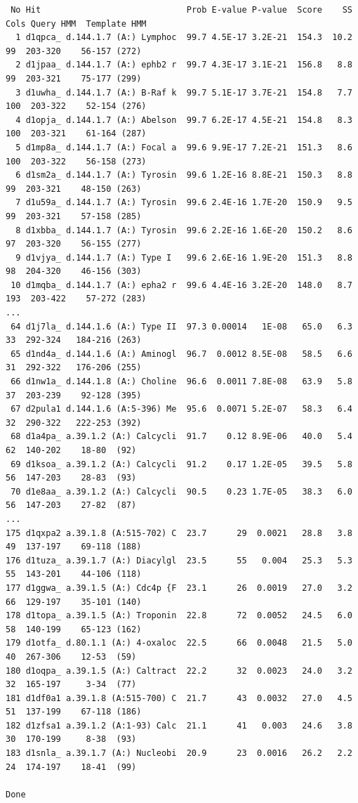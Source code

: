 \documentclass[11pt,a4paper]{article}
\begin{document}
\begin{verbatim}
 No Hit                             Prob E-value P-value  Score    SS Cols Query HMM  Template HMM
  1 d1qpca_ d.144.1.7 (A:) Lymphoc  99.7 4.5E-17 3.2E-21  154.3  10.2   99  203-320    56-157 (272)
  2 d1jpaa_ d.144.1.7 (A:) ephb2 r  99.7 4.3E-17 3.1E-21  156.8   8.8   99  203-321    75-177 (299)
  3 d1uwha_ d.144.1.7 (A:) B-Raf k  99.7 5.1E-17 3.7E-21  154.8   7.7  100  203-322    52-154 (276)
  4 d1opja_ d.144.1.7 (A:) Abelson  99.7 6.2E-17 4.5E-21  154.8   8.3  100  203-321    61-164 (287)
  5 d1mp8a_ d.144.1.7 (A:) Focal a  99.6 9.9E-17 7.2E-21  151.3   8.6  100  203-322    56-158 (273)
  6 d1sm2a_ d.144.1.7 (A:) Tyrosin  99.6 1.2E-16 8.8E-21  150.3   8.8   99  203-321    48-150 (263)
  7 d1u59a_ d.144.1.7 (A:) Tyrosin  99.6 2.4E-16 1.7E-20  150.9   9.5   99  203-321    57-158 (285)
  8 d1xbba_ d.144.1.7 (A:) Tyrosin  99.6 2.2E-16 1.6E-20  150.2   8.6   97  203-320    56-155 (277)
  9 d1vjya_ d.144.1.7 (A:) Type I   99.6 2.6E-16 1.9E-20  151.3   8.8   98  204-320    46-156 (303)
 10 d1mqba_ d.144.1.7 (A:) epha2 r  99.6 4.4E-16 3.2E-20  148.0   8.7  193  203-422    57-272 (283)
...
 64 d1j7la_ d.144.1.6 (A:) Type II  97.3 0.00014   1E-08   65.0   6.3   33  292-324   184-216 (263)
 65 d1nd4a_ d.144.1.6 (A:) Aminogl  96.7  0.0012 8.5E-08   58.5   6.6   31  292-322   176-206 (255)
 66 d1nw1a_ d.144.1.8 (A:) Choline  96.6  0.0011 7.8E-08   63.9   5.8   37  203-239    92-128 (395)
 67 d2pula1 d.144.1.6 (A:5-396) Me  95.6  0.0071 5.2E-07   58.3   6.4   32  290-322   222-253 (392)
 68 d1a4pa_ a.39.1.2 (A:) Calcycli  91.7    0.12 8.9E-06   40.0   5.4   62  140-202    18-80  (92)
 69 d1ksoa_ a.39.1.2 (A:) Calcycli  91.2    0.17 1.2E-05   39.5   5.8   56  147-203    28-83  (93)
 70 d1e8aa_ a.39.1.2 (A:) Calcycli  90.5    0.23 1.7E-05   38.3   6.0   56  147-203    27-82  (87)
...
175 d1qxpa2 a.39.1.8 (A:515-702) C  23.7      29  0.0021   28.8   3.8   49  137-197    69-118 (188)
176 d1tuza_ a.39.1.7 (A:) Diacylgl  23.5      55   0.004   25.3   5.3   55  143-201    44-106 (118)
177 d1ggwa_ a.39.1.5 (A:) Cdc4p {F  23.1      26  0.0019   27.0   3.2   66  129-197    35-101 (140)
178 d1topa_ a.39.1.5 (A:) Troponin  22.8      72  0.0052   24.5   6.0   58  140-199    65-123 (162)
179 d1otfa_ d.80.1.1 (A:) 4-oxaloc  22.5      66  0.0048   21.5   5.0   40  267-306    12-53  (59)
180 d1oqpa_ a.39.1.5 (A:) Caltract  22.2      32  0.0023   24.0   3.2   32  165-197     3-34  (77)
181 d1df0a1 a.39.1.8 (A:515-700) C  21.7      43  0.0032   27.0   4.5   51  137-199    67-118 (186)
182 d1zfsa1 a.39.1.2 (A:1-93) Calc  21.1      41   0.003   24.6   3.8   30  170-199     8-38  (93)
183 d1snla_ a.39.1.7 (A:) Nucleobi  20.9      23  0.0016   26.2   2.2   24  174-197    18-41  (99)

Done
\end{verbatim}
\normalsize
 
\end{document}
